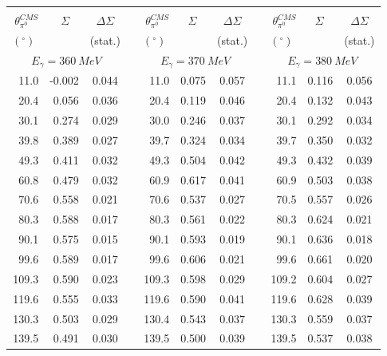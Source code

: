 \begin{table}[htbp] 
\begin{center} 
\begin{tabular}{|r|r|c|l|r|r|c|l|r|r|c|} 

\cline{1-3} 
\cline{5-7} 
\cline{9-11} 
& & & & & & & & & &\\ 
$\theta_{\pi^0}^{CMS}$ & 
$\Sigma\;\;\;$ & 
${\Delta}\Sigma$ & & 
$\theta_{\pi^0}^{CMS}$ & 
$\Sigma\;\;\;$ & 
${\Delta}\Sigma$ & & 
$\theta_{\pi^0}^{CMS}$ & 
$\Sigma\;\;\;$ & 
${\Delta}\Sigma$ \\ 
 $(^{\circ})\;$ & &(stat.) & & $(^{\circ})\;$ & &(stat.) & & $(^{\circ})\;$ & &(stat.) \\ 
\cline{1-3} 
\cline{5-7} 
\cline{9-11} 
\multicolumn{3}{|c|}{ $E_{\gamma}=360~MeV$} & & 
\multicolumn{3}{c|}{ $E_{\gamma}=370~MeV$} & & 
\multicolumn{3}{c|}{ $E_{\gamma}=380~MeV$} \\ 
\cline{1-3} 
\cline{5-7} 
\cline{9-11} 
 11.0 & -0.002 & 0.044 & &  11.0 & 0.075 & 0.057 & &  11.1 & 0.116 & 0.056 \\ 
 20.4 & 0.056 & 0.036 & &  20.4 & 0.119 & 0.046 & &  20.4 & 0.132 & 0.043 \\ 
 30.1 & 0.274 & 0.029 & &  30.0 & 0.246 & 0.037 & &  30.1 & 0.292 & 0.034 \\ 
 39.8 & 0.389 & 0.027 & &  39.7 & 0.324 & 0.034 & &  39.7 & 0.350 & 0.032 \\ 
 49.3 & 0.411 & 0.032 & &  49.3 & 0.504 & 0.042 & &  49.3 & 0.432 & 0.039 \\ 
 60.8 & 0.479 & 0.032 & &  60.9 & 0.617 & 0.041 & &  60.9 & 0.503 & 0.038 \\ 
 70.6 & 0.558 & 0.021 & &  70.6 & 0.537 & 0.027 & &  70.5 & 0.557 & 0.026 \\ 
 80.3 & 0.588 & 0.017 & &  80.3 & 0.561 & 0.022 & &  80.3 & 0.624 & 0.021 \\ 
 90.1 & 0.575 & 0.015 & &  90.1 & 0.593 & 0.019 & &  90.1 & 0.636 & 0.018 \\ 
 99.6 & 0.589 & 0.017 & &  99.6 & 0.606 & 0.021 & &  99.6 & 0.661 & 0.020 \\ 
109.3 & 0.590 & 0.023 & & 109.3 & 0.598 & 0.029 & & 109.2 & 0.604 & 0.027 \\ 
119.6 & 0.555 & 0.033 & & 119.6 & 0.590 & 0.041 & & 119.6 & 0.628 & 0.039 \\ 
130.3 & 0.503 & 0.029 & & 130.4 & 0.543 & 0.037 & & 130.3 & 0.559 & 0.037 \\ 
139.5 & 0.491 & 0.030 & & 139.5 & 0.500 & 0.039 & & 139.5 & 0.537 & 0.038 \\ 

\end{tabular}
\end{center}
\end{table}
